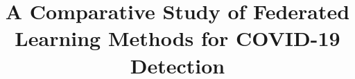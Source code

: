 \newcommand\quickthings[1]{\textblue{\\\faQuestion #1}}
\newcommand\maybelater[1]{\textred{\\\faClockO#1}}
\newcommand\peter[1]{\textcolor{red}{\faComment #1}}
\newcommand\abs[1]{\\\hl{#1}}



\renewcommand\quickthings[1]{}
\renewcommand\peter[1]{}
\renewcommand\maybelater[1]{}
\renewcommand\abs[1]{}
\renewcommand\hl[1]{#1}

\usepackage[linesnumbered,ruled,vlined]{algorithm2e}







    \title{ A Comparative Study of Federated Learning Methods for COVID-19 Detection  }
  
 

